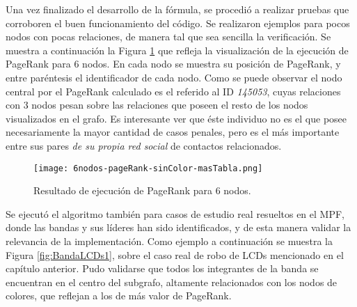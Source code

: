 Una vez finalizado el desarrollo de la fórmula, se procedió a realizar pruebas que corroboren el buen funcionamiento del código. Se realizaron ejemplos para pocos nodos con pocas relaciones, de manera tal que sea sencilla la verificación. Se muestra a continuación la Figura \ref{fig:6nodos-pageRank-sinColor-masTabla} que refleja la visualización de la ejecución de PageRank para 6 nodos. En cada nodo se muestra su posición de PageRank, y entre paréntesis el identificador de cada nodo. Como se puede observar el nodo central por el PageRank calculado es el referido al ID \textit{145053}, cuyas relaciones con 3 nodos pesan sobre las relaciones que poseen el resto de los nodos visualizados en el grafo.
Es interesante ver que éste individuo no es el que posee necesariamente la mayor cantidad de casos penales, pero es el más importante entre sus pares \textit{de su propia red social} de contactos relacionados.


	
\begin{figure}
	\centering
	\texttt{[image: 6nodos-pageRank-sinColor-masTabla.png]}
	\caption{Resultado de ejecución de PageRank para 6 nodos.} 
	\label{fig:6nodos-pageRank-sinColor-masTabla}
\end{figure}

Se ejecutó el algoritmo también para casos de estudio real resueltos en el MPF, donde las bandas y sus líderes han sido identificados, y de esta manera validar la relevancia de la implementación. Como ejemplo a continuación se muestra la Figura \ref{fig:BandaLCDs1}, sobre el caso real de robo de LCDs mencionado en el capítulo anterior. Pudo validarse que todos los integrantes de la banda se encuentran en el centro del subgrafo, altamente relacionados con los nodos de colores, que reflejan a los de más valor de PageRank.

